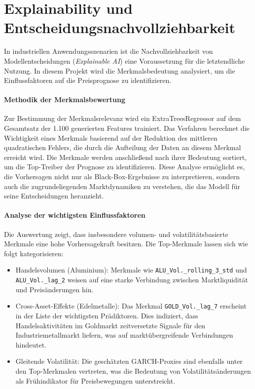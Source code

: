 \section{Explainability und Entscheidungsnachvollziehbarkeit}
\label{sec:explainability}

In industriellen Anwendungsszenarien ist die Nachvollziehbarkeit von Modellentscheidungen (\emph{Explainable AI}) eine Voraussetzung für die letztendliche Nutzung. In diesem Projekt wird die Merkmalsbedeutung analysiert, um die Einflussfaktoren auf die Preisprognose zu identifizieren.

\paragraph{Methodik der Merkmalsbewertung}
Zur Bestimmung der Merkmalsrelevanz wird ein ExtraTreesRegressor auf dem Gesamtsatz der 1.100 generierten Features trainiert. Das Verfahren berechnet die Wichtigkeit eines Merkmals basierend auf der Reduktion des mittleren quadratischen Fehlers, die durch die Aufteilung der Daten an diesem Merkmal erreicht wird. Die Merkmale werden anschließend nach ihrer Bedeutung sortiert, um die Top-Treiber der Prognose zu identifizieren. Diese Analyse ermöglicht es, die Vorhersagen nicht nur als Black-Box-Ergebnisse zu interpretieren, sondern auch die zugrundeliegenden Marktdynamiken zu verstehen, die das Modell für seine Entscheidungen heranzieht.


\paragraph{Analyse der wichtigsten Einflussfaktoren}
Die Auswertung zeigt, dass insbesondere volumen- und volatilitätsbasierte Merkmale eine hohe Vorhersagekraft besitzen. Die Top-Merkmale lassen sich wie folgt kategorisieren:
\begin{itemize}
    \item Handelsvolumen (Aluminium): Merkmale wie \texttt{ALU\_Vol.\_rolling\_3\_std} und \texttt{ALU\_Vol.\_lag\_2} weisen auf eine starke Verbindung zwischen Marktliquidität und Preisänderungen hin.
    \item Cross-Asset-Effekte (Edelmetalle): Das Merkmal \texttt{GOLD\_Vol.\_lag\_7} erscheint in der Liste der wichtigsten Prädiktoren. Dies indiziert, dass Handelsaktivitäten im Goldmarkt zeitversetzte Signale für den Industriemetallmarkt liefern, was auf marktübergreifende Verbindungen hindeutet.
    \item Gleitende Volatilität: Die geschätzten GARCH-Proxies sind ebenfalls unter den Top-Merkmalen vertreten, was die Bedeutung von Volatilitätsänderungen als Frühindikator für Preisbewegungen unterstreicht.
\end{itemize}

